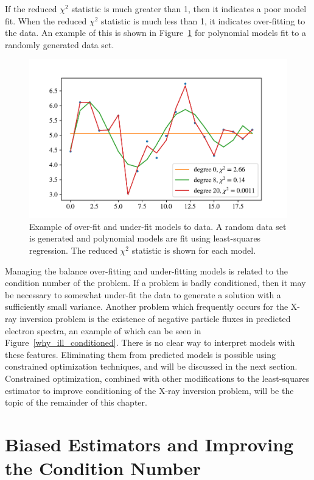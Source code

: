 If the reduced $\chi^2$ statistic is much greater than 1, then it indicates a poor model fit. When the  reduced $\chi^2$ statistic is much less than 1, it indicates over-fitting to the data. An example of this is shown in Figure~\ref{overunderfit_example} for polynomial models fit to a randomly generated data set.

\begin{figure}[p]
    \centering
    \includegraphics[width=1.0\textwidth]{figures/chapter_4/overunderfit_example/overfit_underfit.pdf}
    \caption{Example of over-fit and under-fit models to data. A random data set is generated and polynomial models are fit using least-squares regression. The reduced $\chi^2$ statistic is shown for each model.}
    \label{overunderfit_example}
\end{figure}

Managing the balance over-fitting and under-fitting models is related to the condition number of the problem. If a problem is badly conditioned, then it may be necessary to somewhat under-fit the data to generate a solution with a sufficiently small variance. Another problem which frequently occurs for the X-ray inversion problem is the existence of negative particle fluxes in predicted electron spectra, an example of which can be seen in Figure~\ref{why_ill_conditioned}. There is no clear way to interpret models with these features. Eliminating them from predicted models is possible using constrained optimization techniques, and will be discussed in the next section. Constrained optimization, combined with other modifications to the least-squares estimator to improve conditioning of the X-ray inversion problem, will be the topic of the remainder of this chapter. 

\section{Biased Estimators and Improving the Condition Number}

